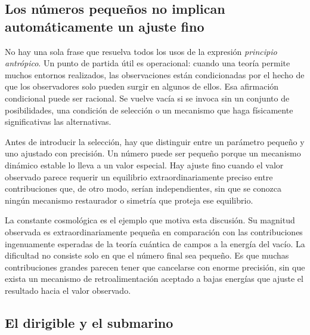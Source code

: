 \subsection{Los números pequeños no implican automáticamente un ajuste fino}

No hay una sola frase que resuelva todos los usos de la expresión \emph{principio antrópico}. Un punto de partida útil es operacional: cuando una teoría permite muchos entornos realizados, las observaciones están condicionadas por el hecho de que los observadores solo pueden surgir en algunos de ellos. Esa afirmación condicional puede ser racional. Se vuelve vacía si se invoca sin un conjunto de posibilidades, una condición de selección o un mecanismo que haga físicamente significativas las alternativas.

Antes de introducir la selección, hay que distinguir entre un parámetro pequeño y uno ajustado con precisión. Un número puede ser pequeño porque un mecanismo dinámico estable lo lleva a un valor especial. Hay ajuste fino cuando el valor observado parece requerir un equilibrio extraordinariamente preciso entre contribuciones que, de otro modo, serían independientes, sin que se conozca ningún mecanismo restaurador o simetría que proteja ese equilibrio.

\begin{classroomqa}
\end{classroomqa}

La constante cosmológica es el ejemplo que motiva esta discusión. Su magnitud observada es extraordinariamente pequeña en comparación con las contribuciones ingenuamente esperadas de la teoría cuántica de campos a la energía del vacío. La dificultad no consiste solo en que el número final sea pequeño. Es que muchas contribuciones grandes parecen tener que cancelarse con enorme precisión, sin que exista un mecanismo de retroalimentación aceptado a bajas energías que ajuste el resultado hacia el valor observado.

\subsection{El dirigible y el submarino}

